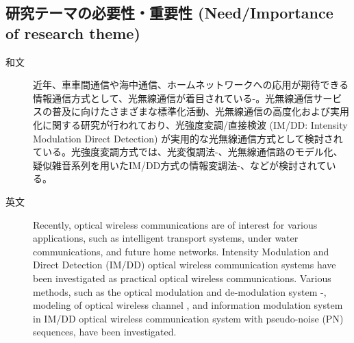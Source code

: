 ﻿\documentclass[a4j,10pt]{jarticle}
\begin{document}
\subsection{研究テーマの必要性・重要性 (Need/Importance of research theme)}
\begin{description}
 \item[和文] 近年、車車間通信や海中通信、ホームネットワークへの応用が期待できる情報通信方式として、光無線通信が着目されている\cite{ocdma1}-\cite{csk2}。光無線通信サービスの普及に向けたさまざまな標準化活動、光無線通信の高度化および実用化に関する研究が行われており、光強度変調/直接検波 (IM/DD: Intensity Modulation Direct Detection) が実用的な光無線通信方式として検討されている。光強度変調方式では、光変復調法\cite{ocdma4}-\cite{scinti}、光無線通信路のモデル化\cite{ocdma5}、疑似雑音系列を用いたIM/DD方式の情報変調法\cite{ook}-\cite{sik2}、などが検討されている。
%
\item[英文] Recently, optical wireless communications are of interest for various applications, such as intelligent transport systems, under water communications, and future home networks. Intensity Modulation and Direct Detection (IM/DD) optical wireless communication systems have been investigated as practical optical wireless communications. Various methods, such as the optical modulation and de-modulation system \cite{ocdma4}-\cite{scinti}, modeling of optical wireless channel \cite{ocdma5}, and information modulation system in IM/DD optical wireless communication system with pseudo-noise (PN) sequences, have been investigated. 
\end{description}
%
\end{document}
